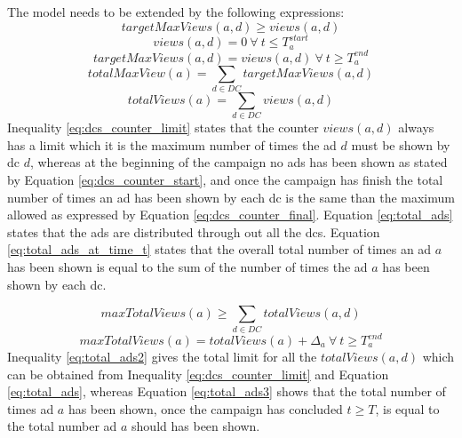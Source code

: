 The model needs to be extended by the following expressions:
\begin{equation} \label{eq:dcs_counter_limit}
	targetMaxViews(a, d) \ge views(a, d)
\end{equation}
\begin{equation} \label{eq:dcs_counter_start}
	views(a, d) = 0 ~ \forall ~ t \le T^{start}_{a}
\end{equation}
\begin{equation} \label{eq:dcs_counter_final}
	targetMaxViews(a, d) =  views(a, d) ~ \forall ~ t \ge T^{end}_{a}
\end{equation}
\begin{equation} \label{eq:total_ads}
	totalMaxView(a)  = \sum_{d \in DC} targetMaxViews(a, d)
\end{equation}
\begin{equation} \label{eq:total_ads_at_time_t}
	totalViews(a) =  \sum_{d \in DC} views(a, d)
\end{equation}
Inequality \ref{eq:dcs_counter_limit} states that the counter $views(a, d)$ always has a limit which it is the maximum number of times the ad $d$ must be shown by \gls{dc} $d$, whereas at the beginning of the campaign no ads has been shown as stated by Equation \ref{eq:dcs_counter_start}, and once the campaign has finish the total number of times an ad has been shown by each \gls{dc} is the same than the maximum allowed as expressed by Equation \ref{eq:dcs_counter_final}. Equation \ref{eq:total_ads} states that the ads are distributed through out all the \glspl{dc}. Equation \ref{eq:total_ads_at_time_t} states that the overall total number of times an ad $a$ has been shown is equal to the sum of the number of times the ad $a$ has been shown by each \gls{dc}.

\begin{equation} \label{eq:total_ads2}
	maxTotalViews(a) \ge \sum_{d \in DC} totalViews(a, d)
\end{equation}
\begin{equation} \label{eq:total_ads3}
	maxTotalViews(a) = totalViews(a) + \Delta_{a} ~ \forall ~ t \ge T^{end}_{a}
\end{equation}
Inequality \ref{eq:total_ads2} gives the total limit for all the $totalViews(a, d)$ which can be obtained from Inequality \ref{eq:dcs_counter_limit} and Equation \ref{eq:total_ads}, whereas Equation \ref{eq:total_ads3} shows that the total number of times ad $a$ has been shown, once the campaign has concluded $t \ge T$, is equal to the total number ad $a$ should has been shown.

